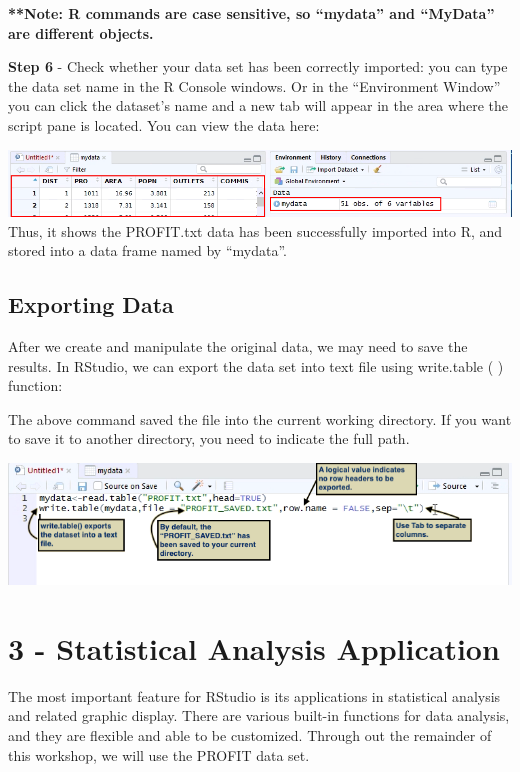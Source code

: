 \documentclass[a4paper]{report}
\begin{document}
\begin{flushleft}
        \textbf{**Note: R commands are case sensitive, so “mydata” and “MyData” are different objects.}
       \newline\newline
       
       \textbf{ Step 6} - Check whether your data set has been correctly imported: you can type the data set name in the R Console windows. Or in the ``Environment Window'' you can click the dataset's name and a new tab will appear in the area where the script pane is located. You can view the data here:
       \newline\newline
       
       \includegraphics[width=\textwidth]{images/ID4.png}
           Thus, it shows the PROFIT.txt data has been successfully imported into R, and stored into a data frame named by “mydata”.
        \end{flushleft}
        
        
    \section{Exporting Data}
        \begin{flushleft}
        After we create and manipulate the original data, we may need to save the results. In RStudio, we can export the data set into text file using write.table ( ) function:
        
        The above command saved the file into the current working directory. If you want to save it to another directory, you need to indicate the full path.

       \includegraphics[width=\textwidth]{images/ID5.png}
       \end{flushleft}
 

\chapter{3 - Statistical Analysis Application}
        \begin{flushleft}
        The most important feature for RStudio is its applications in statistical analysis and related graphic display. There are various built-in functions for data analysis, and they are flexible and able to be customized. Through out the remainder of this workshop, we will use the PROFIT data set.
        \end{flushleft}
        
\end{document}
